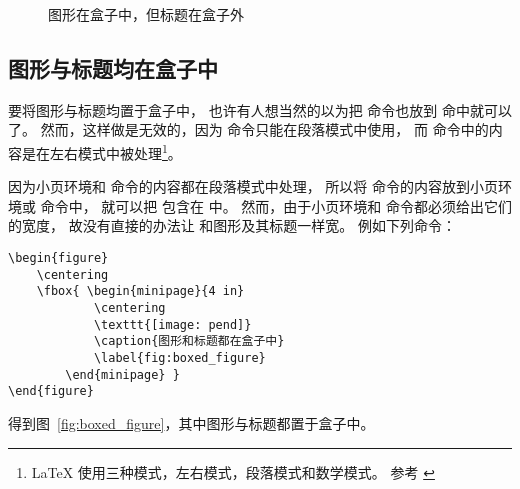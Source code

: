 \begin{figure}
	\centering
	\caption{图形在盒子中，但标题在盒子外}
	\label{fig:boxed_graphic}
\end{figure}

\subsection{图形与标题均在盒子中}

要将图形与标题均置于盒子中，
也许有人想当然的以为把  命令也放到  命中就可以了。
然而，这样做是无效的，因为  命令只能在段落模式中使用，
而  命令中的内容是在左右模式中被处理\footnote{
	\LaTeX{} 使用三种模式，左右模式，段落模式和数学模式。
	参考 \cite[第36页]{lamport1994}}。

因为小页环境和  命令的内容都在段落模式中处理，
所以将  命令的内容放到小页环境或  命令中，
就可以把  包含在  中。
然而，由于小页环境和  命令都必须给出它们的宽度，
故没有直接的办法让  和图形及其标题一样宽。
例如下列命令：
\begin{lstlisting}
\begin{figure}
	\centering
	\fbox{ \begin{minipage}{4 in}
			\centering
			\texttt{[image: pend]}
			\caption{图形和标题都在盒子中}
			\label{fig:boxed_figure}
		\end{minipage} }
\end{figure}
\end{lstlisting}
得到图~\ref{fig:boxed_figure}，其中图形与标题都置于盒子中。

\begin{figure}
	\centering
	\end{figure}

